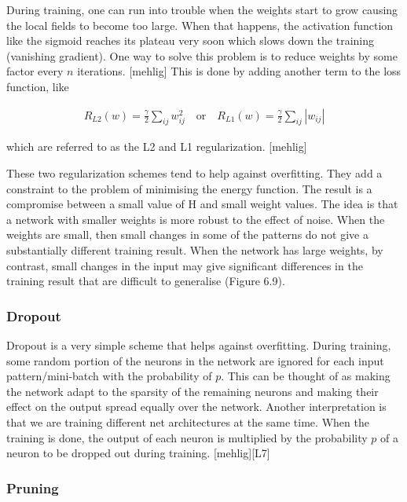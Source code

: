 During training, one can run into trouble when the weights start to grow causing the local fields to become too large. When that happens, the activation function like the sigmoid reaches its plateau very soon which slows down the training (vanishing gradient). One way to solve this problem is to reduce weights by some factor every $ n $ iterations. [mehlig] This is done by adding another term to the loss function, like

\begin{gather}
	R_{L2}(w) = \frac{\gamma}{2} \sum\limits_{ij} w_{ij}^{2} \quad \text{or} \quad R_{L1}(w) = \frac{\gamma}{2} \sum\limits_{ij} |w_{ij}|
\end{gather}

\noindent which are referred to as the L2 and L1 regularization. [mehlig]

These two regularization schemes tend to help against overfitting. They add a constraint to the problem of minimising the energy function. The result is a compromise between a small value of H and small weight values. The idea is that a network with smaller weights is more robust to the effect of noise. When the weights are small, then small changes in some of the
patterns do not give a substantially different training result. When the network has large weights, by contrast, small changes in the input may give significant differences in the training result that are difficult to generalise (Figure 6.9).

\subsubsection{Dropout}

Dropout is a very simple scheme that helps against overfitting. During training, some random portion of the neurons in the network are ignored for each input pattern/mini-batch with the probability of $ p $. This can be thought of as making the network adapt to the sparsity of the remaining neurons and making their effect on the output spread equally over the network. Another interpretation is that we are training different net architectures at the same time. When the training is done, the output of each neuron is multiplied by the probability $ p $ of a neuron to be dropped out during training.  [mehlig][L7]

\subsubsection{Pruning}

